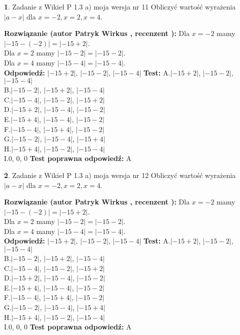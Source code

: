 \documentclass[12pt, a4paper]{article}
\theoremstyle{definition} %
\newtheorem{zad}{}
\newcommand{\zadStart}[1]{\begin{zad}#1\newline}
\newcommand{\zadStop}{\end{zad}}
\newcommand{\rozwStart}[2]{\noindent \textbf{Rozwiązanie (autor #1 , recenzent #2): }\newline}
\newcommand{\rozwStop}{\newline}
\newcommand{\odpStart}{\noindent \textbf{Odpowiedź:}\newline}
\newcommand{\odpStop}{\newline}
\newcommand{\testStart}{\noindent \textbf{Test:}\newline}
\newcommand{\testStop}{\newline}
\newcommand{\kluczStart}{\noindent \textbf{Test poprawna odpowiedź:}\newline}
\newcommand{\kluczStop}{\newline}
\begin{document}
\zadStart{Zadanie z Wikieł P 1.3 a) moja wersja nr 11}
Obliczyć wartość wyrażenia $|a - x|$ dla $x=-2,x=2,x=4$.
\zadStop
\rozwStart{Patryk Wirkus}{}
Dla $x = -2$ mamy $|-15 - (-2)| = |-15 + 2|$.\\
Dla $x = 2$ mamy $|-15 - 2| = |-15 - 2|$.\\
Dla $x = 4$ mamy $|-15 - 4| = |-15 - 4|$.\\
\rozwStop
\odpStart
$|-15 + 2|$, $|-15 - 2|$, $|-15 - 4|$
\odpStop
\testStart
A.$|-15 + 2|$, $|-15 - 2|$, $|-15 - 4|$\\
B.$|-15 - 2|$, $|-15 + 2|$, $|-15 - 4|$\\
C.$|-15 - 4|$, $|-15 - 2|$, $|-15 + 2|$\\
D.$|-15 + 2|$, $|-15 - 4|$, $|-15 - 2|$\\
E.$|-15 + 4|$, $|-15 - 4|$, $|-15 - 2|$\\
F.$|-15 - 4|$, $|-15 + 4|$, $|-15 - 2|$\\
G.$|-15 - 2|$, $|-15 - 4|$, $|-15 + 4|$\\
H.$|-15 + 4|$, $|-15 - 2|$, $|-15 - 4|$\\
I.$0$, $0$, $0$
\testStop
\kluczStart
A
\kluczStop



\zadStart{Zadanie z Wikieł P 1.3 a) moja wersja nr 12}
Obliczyć wartość wyrażenia $|a - x|$ dla $x=-2,x=2,x=4$.
\zadStop
\rozwStart{Patryk Wirkus}{}
Dla $x = -2$ mamy $|-15 - (-2)| = |-15 + 2|$.\\
Dla $x = 2$ mamy $|-15 - 2| = |-15 - 2|$.\\
Dla $x = 4$ mamy $|-15 - 4| = |-15 - 4|$.\\
\rozwStop
\odpStart
$|-15 + 2|$, $|-15 - 2|$, $|-15 - 4|$
\odpStop
\testStart
A.$|-15 + 2|$, $|-15 - 2|$, $|-15 - 4|$\\
B.$|-15 - 2|$, $|-15 + 2|$, $|-15 - 4|$\\
C.$|-15 - 4|$, $|-15 - 2|$, $|-15 + 2|$\\
D.$|-15 + 2|$, $|-15 - 4|$, $|-15 - 2|$\\
E.$|-15 + 4|$, $|-15 - 4|$, $|-15 - 2|$\\
F.$|-15 - 4|$, $|-15 + 4|$, $|-15 - 2|$\\
G.$|-15 - 2|$, $|-15 - 4|$, $|-15 + 4|$\\
H.$|-15 + 4|$, $|-15 - 2|$, $|-15 - 4|$\\
I.$0$, $0$, $0$
\testStop
\kluczStart
A
\kluczStop
\end{document}
